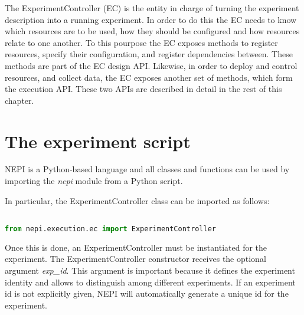 %
%
%
%
%
%


The ExperimentController (EC) is the entity in charge of turning the 
experiment description into a running experiment. 
In order to do this the EC needs to know which resources are to be 
used, how they should be configured and how resources relate to one another.
To this pourpose the EC exposes methods to register resources, specify their 
configuration, and register dependencies between. These methods are part of
the EC design API.
Likewise, in order to deploy and control resources, and collect data, 
the EC exposes another set of methods, which form the execution API. 
These two APIs are described in detail in the rest of this chapter.


\section{The experiment script}

NEPI is a Python-based language and all classes and functions can
be used by importing the \emph{nepi} module from a Python script.

In particular, the ExperimentController class can be imported as follows:

\begin{lstlisting}[language=Python]

from nepi.execution.ec import ExperimentController

\end{lstlisting}

Once this is done, an ExperimentController must be instantiated for
the experiment. The ExperimentController constructor receives
the optional argument \emph{exp\_id}. This argument is important because
it defines the experiment identity and allows to distinguish among different
experiments. If an experiment id is not explicitly given, NEPI will automatically
generate a unique id for the experiment. 

